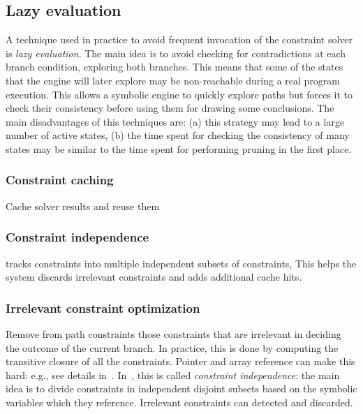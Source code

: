 \subsection{Lazy evaluation}
 A technique used in practice to avoid frequent invocation of the constraint solver is {\em lazy evaluation}. The main idea is to avoid checking for contradictions at each branch condition, exploring both branches. This means that some of the states that the engine will later explore may be non-reachable during a real program execution. This allows a symbolic engine to quickly explore paths but forces it to check their consistency before using them for drawing some conclusions. The main disadvantages of this techniques are: (a) this strategy may lead to a large number of active states, (b) the time spent for checking the consistency of many states may be similar to the time spent for performing pruning in the first place.
\fi

\iffalse

\subsubsection{Constraint caching} Cache solver results and reuse them 

\subsubsection{Constraint independence} tracks constraints into multiple independent subsets of constraints, This helps the system discards irrelevant constraints and adds additional cache hits.  

\subsubsection{Irrelevant constraint optimization} Remove from path constraints those constraints that are irrelevant in deciding the outcome of the current branch. In practice, this is done by computing the transitive closure of all the constraints. Pointer and array reference can make this hard: e.g., see details in~\cite{EXE-CCS06,EGL-ISSTA09,CUTE-FSE05}. In~\cite{KLEE-OSDI08}, this is called {\em constraint independence}: the main idea is to divide constraints in independent disjoint subsets based on the symbolic variables which they reference. Irrelevant constraints can detected and discarded.

